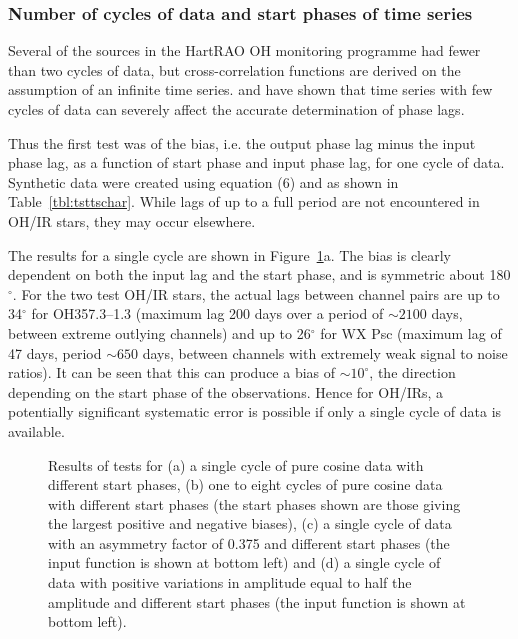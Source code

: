 \documentclass[usenatbib,usegraphicx]{mn2e}
\begin{document}
\subsubsection{Number of cycles of data and start phases of time series}

Several of the sources in the HartRAO OH monitoring programme had fewer than
two cycles of data, but cross-correlation functions are derived on the
assumption of an infinite time series.  \citet{Welsh99} and \citet{Vio01}
have shown that time series with few cycles of data can severely affect the
accurate determination of phase lags.  

Thus the first test was of the bias, 
i.e. the output phase lag minus the input phase lag, 
as a function of start phase and input phase lag, for one cycle of data.
Synthetic data were created using equation (6) and as shown in
Table~\ref{tbl:tsttschar}.  While
lags of up to a full period are not encountered in OH/IR stars, they 
may occur elsewhere.

The results for a single cycle are shown in Figure~\ref{fig:tohtsch}a.  The
bias is clearly dependent on both the input lag and the start phase, and is
symmetric about 180$^\circ$.  For the two test OH/IR stars, the actual lags
between channel pairs are up to 34$^\circ$ for OH357.3--1.3 (maximum lag 200
days over a period of $\sim2100$ days, between extreme outlying channels)
and up to 26$^\circ$ for WX Psc (maximum lag of 47 days, period $\sim650$
days, between channels with extremely weak signal to noise ratios).  It can
be seen that this can produce a bias of $\sim10^\circ$, the direction
depending on the start phase of the observations. Hence for OH/IRs, a
potentially significant systematic error is possible if only a single cycle
of data is available.


\begin{figure}
\caption{Results of tests for (a) a single cycle of pure cosine data with
different start phases, (b) one to eight cycles of pure cosine data with
different start phases (the start phases shown are those giving the largest
positive and negative biases), (c) a single cycle of data with an asymmetry
factor of 0.375 and different start phases (the input function is shown at
bottom left) and (d) a single cycle of data with positive variations in
amplitude equal to half the amplitude and different start phases (the input
function is shown at bottom left).}
\label{fig:tohtsch}
\end{figure}
\end{document}
